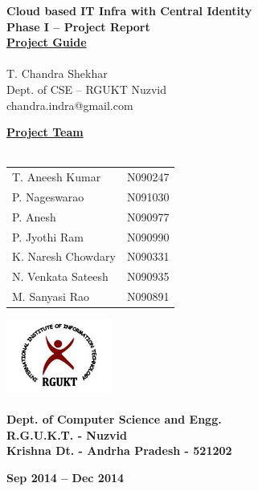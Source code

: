 \documentclass[12pt]{report}
\begin{document}
\begin{titlepage}
 \begin{center}
\LARGE
\textbf{Cloud based IT Infra with Central Identity} \\
\vfill
\textbf{Phase I -- Project Report }\\
\vfill
\Large
\underline{\textbf{Project Guide }} \\ 
\large
\underline{} \\
T. Chandra Shekhar \\
\small
Dept. of CSE -- RGUKT Nuzvid \\
\small
chandra.indra@gmail.com
\vfill

\Large
\textbf{\underline{ Project Team } } \\
\underline{} \\
\large
\begin{tabular}{l  l}
T. Aneesh Kumar & N090247  \\
P. Nageswarao  & N091030  \\
P. Anesh  & N090977  \\
P. Jyothi Ram & N090990  \\
K. Naresh Chowdary  & N090331  \\
N. Venkata Sateesh  & N090935  \\
M. Sanyasi Rao & N090891 
\end{tabular}

\vfill


\includegraphics[width=3.5cm]{rgukt_logo.jpg} 
\Large
\underline{} \\
\underline{} \\
\normalsize
\textbf{Dept. of Computer Science and Engg. } \\
\textbf{R.G.U.K.T. - Nuzvid } \\
\textbf{Krishna Dt. - Andrha Pradesh - 521202}


\normalsize
\vfill
%
%

\textbf{Sep 2014 -- Dec 2014 }

\end{center}
\end{titlepage}
\end{document}
